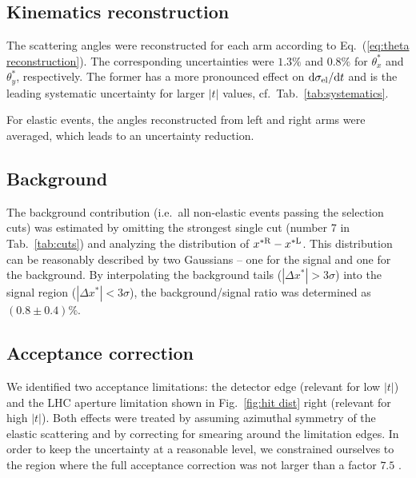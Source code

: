 \documentclass[doublecol]{../macros/epl2}
\def\d{{\rm d}}
\begin{document}
\subsection{Kinematics reconstruction}

The scattering angles were reconstructed for each arm according to Eq.~(\ref{eq:theta reconstruction}). The corresponding uncertainties were $1.3\%$ and $0.8\%$ for $\theta^*_x$ and $\theta^*_y$, respectively. The former has a more pronounced effect on $\d\sigma_{\rm el}/\d t$
and is the leading systematic uncertainty for larger $|t|$ values, cf.~Tab.~\ref{tab:systematics}.

For elastic events, the angles reconstructed from left and right arms were averaged, which leads to an uncertainty reduction.

\subsection{Background}

The background contribution (i.e.~all non-elastic events passing the selection cuts) was estimated by omitting the strongest single cut (number 7 in Tab.~\ref{tab:cuts}) and analyzing the distribution of $x^{*\rm R} - x^{*\rm L}$. This distribution can be reasonably described by two Gaussians -- one for the signal and one for the background. By interpolating the background tails ($|\Delta x^*| > 3\sigma$) into the signal region ($|\Delta x^*| < 3\sigma$), the background/signal ratio was determined as $(0.8 \pm 0.4)\%$.


\subsection{Acceptance correction}

We identified two acceptance limitations: the detector edge (relevant for low $|t|$) and the LHC aperture limitation shown in Fig.~\ref{fig:hit dist} right (relevant for high $|t|$). Both effects were treated by assuming azimuthal symmetry of the elastic scattering and by correcting for smearing around the limitation edges. In order to keep the uncertainty at a reasonable level, we constrained ourselves to the region where the full acceptance correction was not larger than a factor $7.5$%
.
\end{document}
